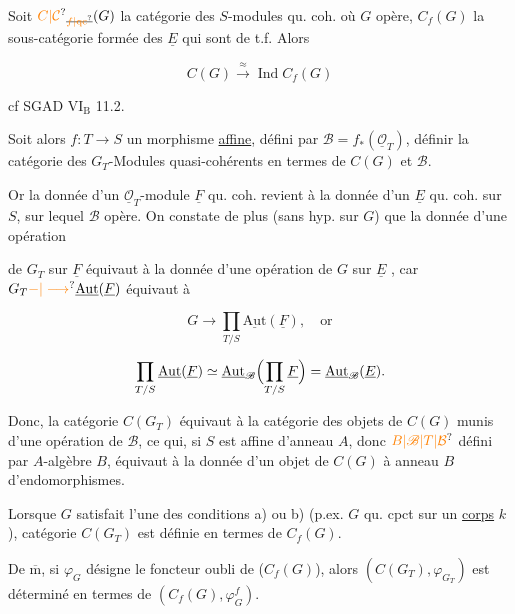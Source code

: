 
 Soit $\unsure{C|\mathcal C}_{\deleted{\unsure{f|\mathrm{qc}}}}(G)$ la catégorie des $S$-modules qu. coh. où $G$ opère, $C_f(G)$ la sous-catégorie formée des $\underline E$ qui sont de t.f. Alors

\[
C(G)\overset{\approx}{\longrightarrow}\operatorname{Ind} C_f(G)
\]

cf SGAD $\mathrm{VI}_{\mathrm B}$ 11.2.

Soit alors $f:T\longrightarrow S$ un morphisme \uline{affine}, défini par $\mathscr B=f_*(\underline{\mathcal O}_T)$,    définir la catégorie des $G_T$-Modules quasi-cohérents en termes de $C(G)$ et $\mathscr B$.

Or la donnée d'un $\underline{\mathcal O}_T$-module $\underline F$ qu. coh. revient à la donnée d'un $\underline E$  qu. coh. sur $S$, sur lequel $\mathscr B$ opère. On constate de plus (sans hyp. sur $G$) que la donnée d'une opération

de $G_T$ sur $\underline F$ équivaut à la donnée d'une opération de $G$ sur $\underline E$ , car $G_T\unsure{-|\longrightarrow}\underline{\mathrm{Aut}}(\underline F)$ équivaut à

\[
G\longrightarrow\prod_{T/S}\underline{\mathrm{Aut}}(\underline F),\quad\text{or}
\]

\[
\prod_{T/S}\underline{\mathrm{Aut}}(\underline F)\simeq
\underline{\mathrm{Aut}}_{\mathscr B}\Bigl(\prod_{T/S}\underline F\Bigr)
=\underline{\mathrm{Aut}}_{\mathscr B}(\underline E).
\]

Donc, la catégorie $C(G_T)$ équivaut à la catégorie des objets de $C(G)$ munis d'une opération de $\mathscr B$, ce qui, si $S$ est affine d'anneau $A$, donc $\unsure{B|\mathscr B|T|\mathcal B}$ défini par $A$-algèbre $B$, équivaut à la  donnée d'un objet de $C(G)$ à anneau $B$ d'endomorphismes.

Lorsque $G$ satisfait l'une des conditions a) ou b) (p.ex. $G$ qu. cpct sur un \uline{corps} $k$),  catégorie $C(G_T)$ est définie en termes de $C_f(G)$.

De $\overline{\mathrm m}$, si $\varphi_G$  désigne le foncteur oubli de  ($C_f(G)$), alors $(C(G_T),\varphi_{G_T})$ est déterminé en termes de $(C_f(G),\varphi_G^f)$.

